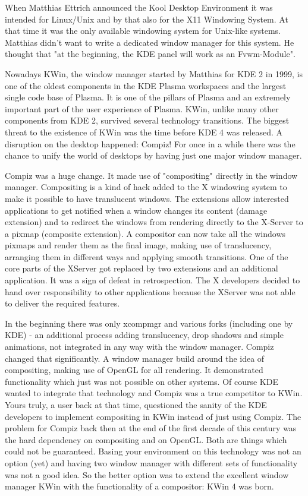
\noindent{}When Matthias Ettrich announced the Kool Desktop Environment it was intended for Linux/Unix and by that also for the X11 Windowing System. At that time it was the only available windowing system for Unix-like systems. Matthias didn't want to write a dedicated window manager for this system. He thought that "at the beginning, the KDE panel will work as an Fvwm-Module".

Nowadays KWin, the window manager started by Matthias for KDE 2 in 1999, is one of the oldest components in the KDE Plasma workspaces and the largest single code base of Plasma. It is one of the pillars of Plasma and an extremely important part of the user experience of Plasma. KWin, unlike many other components from KDE 2, survived several technology transitions. The biggest threat to the existence of KWin was the time before KDE 4 was released. A disruption on the desktop happened: Compiz! For once in a while there was the chance to unify the world of desktops by having just one major window manager.

Compiz was a huge change. It made use of "compositing" directly in the window manager. Compositing is a kind of hack added to the X windowing system to make it possible to have translucent windows. The extensions allow interested applications to get notified when a window changes its content (damage extension) and to redirect the windows from rendering directly to the X-Server to a pixmap (composite extension). A compositor can now take all the windows pixmaps and render them as the final image, making use of translucency, arranging them in different ways and applying smooth transitions. One of the core parts of the XServer got replaced by two extensions and an additional application. It was a sign of defeat in retrospection. The X developers decided to hand over responsibility to other applications because the XServer was not able to deliver the required features.

In the beginning there was only xcompmgr and various forks (including one by KDE) - an additional process adding translucency, drop shadows and simple animations, not integrated in any way with the window manager. Compiz changed that significantly. A window manager build around the idea of compositing, making use of OpenGL for all rendering. It demonstrated functionality which just was not possible on other systems. Of course KDE wanted to integrate that technology and Compiz was a true competitor to KWin. Yours truly, a user back at that time, questioned the sanity of the KDE developers to implement compositing in KWin instead of just using Compiz. The problem for Compiz back then at the end of the first decade of this century was the hard dependency on compositing and on OpenGL. Both are things which could not be guaranteed. Basing your environment on this technology was not an option (yet) and having two window manager with different sets of functionality was not a good idea. So the better option was to extend the excellent window manager KWin with the functionality of a compositor: KWin 4 was born.


